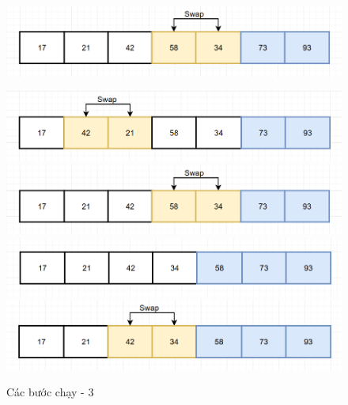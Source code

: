 \begin{figure}[H]
    \centering
    \includegraphics[width=1\linewidth]{img/bubble_sort/11.png}
    
    \vspace{0.5cm}
    \includegraphics[width=1\linewidth]{img/bubble_sort/12.png}
    \vspace{0.5cm}
    \includegraphics[width=1\linewidth]{img/bubble_sort/13.png}
    \vspace{0.5cm}
    \includegraphics[width=1\linewidth]{img/bubble_sort/14.png}
    \vspace{0.5cm}
    \includegraphics[width=1\linewidth]{img/bubble_sort/15.png}
    \caption{Các bước chạy - 3}
    \label{fig:part3}
\end{figure}

